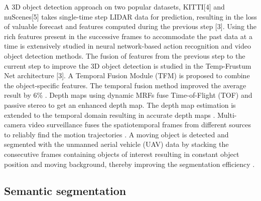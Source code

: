	A 3D object detection approach on two popular datasets, KITTI[4] and nuScenes[5] takes single-time step LIDAR data for prediction, resulting in the loss of valuable forecast and features computed during the previous step [3]. Using the rich features present in the successive frames to accommodate the past data at a time is extensively studied in neural network-based action recognition \cite{10_han2016seq} \cite{11_kang2017t} \cite{12_ning2017spatially} \cite{13_lu2020retinatrack} and video object detection \cite{14_kopuklu2019you} \cite{15_feichtenhofer2016convolutional} \cite{16_wang2016temporal} methods. The fusion of features from the previous step to the current step to improve the 3D object detection is studied in the Temp-Frustum Net architecture [3]. A Temporal Fusion Module (TFM) is proposed to combine the object-specific features. The temporal fusion method improved the average result by 6\% \cite{17_erccelik2021temp}. Depth maps using dynamic MRFs fuse Time-of-Flight (TOF) and passive stereo to get an enhanced depth map. The depth map estimation is extended to the temporal domain resulting in accurate depth maps \cite{18_zhu2009spatial}. Multi-camera video surveillance fuses the spatiotemporal frames from different sources to reliably find the motion trajectories \cite{19_wu2003multi}. A moving object is detected and segmented with the unmanned aerial vehicle (UAV) data by stacking the consecutive frames containing objects of interest resulting in constant object position and moving background, thereby improving the segmentation efficiency \cite{20_teutsch2012spatio}.

    \subsection{Semantic segmentation}
	
